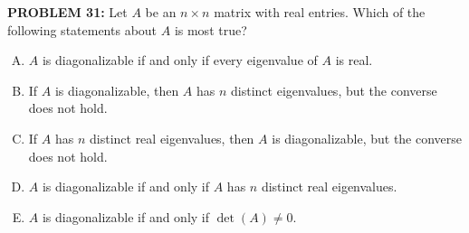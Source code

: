 \documentclass[12pt]{amsart}
\begin{document}
{\bf PROBLEM 31:}
%
Let $A$ be an $n \times n$ matrix with real entries. Which of the following statements about $A$ is most true?

\begin{enumerate}[(A)]
\item $A$ is diagonalizable if and only if every eigenvalue of $A$ is real.
\item If $A$ is diagonalizable, then $A$ has $n$ distinct eigenvalues, but the converse does not hold.
\item If $A$ has $n$ distinct real eigenvalues, then $A$ is diagonalizable, but the converse does not hold.
\item $A$ is diagonalizable if and only if $A$ has $n$ distinct real eigenvalues.
\item $A$ is diagonalizable if and only if $\det(A) \neq 0$.
\end{enumerate}

%
%
%
\end{document}
